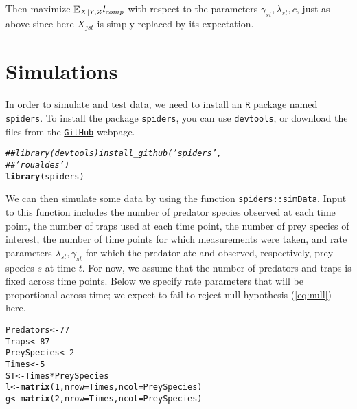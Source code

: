 \documentclass[12pt]{article}\usepackage[]{graphicx}\usepackage[]{color}
\makeatletter
\newcommand{\hlnum}[1]{\textcolor[rgb]{0.686,0.059,0.569}{#1}}%
\newcommand{\hlcom}[1]{\textcolor[rgb]{0.678,0.584,0.686}{\textit{#1}}}%
\newcommand{\hlopt}[1]{\textcolor[rgb]{0,0,0}{#1}}%
\newcommand{\hlstd}[1]{\textcolor[rgb]{0.345,0.345,0.345}{#1}}%
\newcommand{\hlkwb}[1]{\textcolor[rgb]{0.69,0.353,0.396}{#1}}%
\newcommand{\hlkwc}[1]{\textcolor[rgb]{0.333,0.667,0.333}{#1}}%
\newcommand{\hlkwd}[1]{\textcolor[rgb]{0.737,0.353,0.396}{\textbf{#1}}}%
\newenvironment{kframe}{%
 \def\at@end@of@kframe{}%
 \ifinner\ifhmode%
  \def\at@end@of@kframe{\end{minipage}}%
  \begin{minipage}{\columnwidth}%
 \fi\fi%
 \def\FrameCommand##1{\hskip\@totalleftmargin \hskip-\fboxsep
 \colorbox{shadecolor}{##1}\hskip-\fboxsep
     \hskip-\linewidth \hskip-\@totalleftmargin \hskip\columnwidth}%
 \MakeFramed {\advance\hsize-\width
   \@totalleftmargin\z@ \linewidth\hsize
   \@setminipage}}%
 {\par\unskip\endMakeFramed%
 \at@end@of@kframe}
\newenvironment{knitrout}{}{} %
\makeatother
\begin{document}
\noindent Then maximize $\mathbb{E}_{X|Y,Z}l_{comp}$ with respect to the parameters $\gamma_{st}, \lambda_{st}, c$, just as above since here $X_{jst}$ is simply replaced by its expectation.

\section{Simulations}

In order to simulate and test data, we need to install an \texttt{R} package named \texttt{spiders}.  To install the package \texttt{spiders}, you can use \texttt{devtools}, or download the files from the \href{https://github.com/roualdes/spiders}{\texttt{GitHub}} webpage.

\begin{knitrout}
\color{fgcolor}\begin{kframe}
\begin{alltt}
\hlcom{## library(devtools) install_github('spiders',}
\hlcom{## 'roualdes')}
\hlkwd{library}\hlstd{(spiders)}
\end{alltt}
\end{kframe}
\end{knitrout}


We can then simulate some data by using the function \texttt{spiders::simData}.  Input to this function includes the number of predator species observed at each time point, the number of traps used at each time point, the number of prey species of interest, the number of time points for which measurements were taken, and rate parameters $\lambda_{st}, \gamma_{st}$ for which the predator ate and observed, respectively, prey species $s$ at time $t$.  For now, we assume that the number of predators and traps is fixed across time points.  Below we specify rate parameters that will be proportional across time; we expect to fail to reject null hypothesis (\ref{eq:null}) here. 

\begin{knitrout}
\color{fgcolor}\begin{kframe}
\begin{alltt}
\hlstd{Predators} \hlkwb{<-} \hlnum{77}
\hlstd{Traps} \hlkwb{<-} \hlnum{87}
\hlstd{PreySpecies} \hlkwb{<-} \hlnum{2}
\hlstd{Times} \hlkwb{<-} \hlnum{5}
\hlstd{ST} \hlkwb{<-} \hlstd{Times} \hlopt{*} \hlstd{PreySpecies}
\hlstd{l} \hlkwb{<-} \hlkwd{matrix}\hlstd{(}\hlnum{1}\hlstd{,} \hlkwc{nrow} \hlstd{= Times,} \hlkwc{ncol} \hlstd{= PreySpecies)}
\hlstd{g} \hlkwb{<-} \hlkwd{matrix}\hlstd{(}\hlnum{2}\hlstd{,} \hlkwc{nrow} \hlstd{= Times,} \hlkwc{ncol} \hlstd{= PreySpecies)}
\end{alltt}
\end{kframe}
\end{knitrout}
\end{document}
